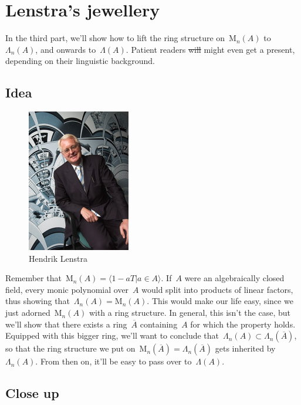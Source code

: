 \section{Lenstra's jewellery}
In the third part, we'll show how to lift the ring structure on~$\mathrm{M}_{n}(A)$ to~$\Lambda_{n}(A)$, and onwards to~$\Lambda(A)$. Patient readers \sout{will} might even get a present, depending on their linguistic background.

\subsection{Idea}

\begin{figure}
  \centering
  \includegraphics[width=.3\textwidth]{playing-witt-rings/lenstra}
  \caption{Hendrik Lenstra}
\end{figure}

Remember that~$\mathrm{M}_{n}(A)=\langle {1-aT  \vert  a \in A} \rangle$. If~$A$ were an algebraically closed field, every monic polynomial over~$A$ would split into products of linear factors, thus showing that~$\Lambda_{n}(A)=\mathrm{M}_{n}(A)$. This would make our life easy, since we just adorned~$\mathrm{M}_{n}(A)$ with a ring structure. In general, this isn't the case, but we'll show that there exists a ring~$\overline{A}$ containing~$A$ for which the property holds. Equipped with this bigger ring, we'll want to conclude that~$\Lambda_{n}(A) \subset \Lambda_{n}(\overline{A})$, so that the ring structure we put on~$\mathrm{M}_{n}(\overline{A})=\Lambda_{n}(\overline{A})$ gets inherited by~$\Lambda_{n}(A)$. From then on, it'll be easy to pass over to~$\Lambda(A)$.

\subsection{Close up}

